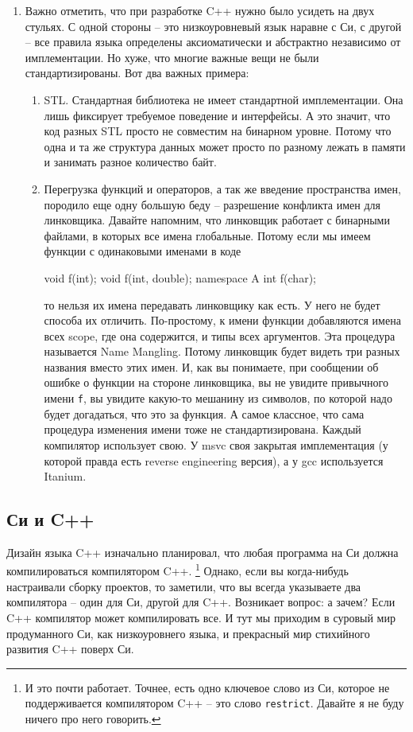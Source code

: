 \begin{enumerate}
\item %
Важно отметить, что при разработке C++ нужно было усидеть на двух стульях.
С одной стороны -- это низкоуровневый язык наравне с Си, с другой -- все правила языка определены аксиоматически и абстрактно независимо от имплементации.
Но хуже, что многие важные вещи не были стандартизированы.
Вот два важных примера:
\begin{enumerate}
\item STL.
Стандартная библиотека не имеет стандартной имплементации.
Она лишь фиксирует требуемое поведение и интерфейсы.
А это значит, что код разных STL просто не совместим на бинарном уровне.
Потому что одна и та же структура данных может просто по разному лежать в памяти и занимать разное количество байт.

\item Перегрузка функций и операторов, а так же введение пространства имен, породило еще одну большую беду -- разрешение конфликта имен для линковщика.
Давайте напомним, что линковщик работает с бинарными файлами, в которых все имена глобальные.
Потому если мы имеем функции с одинаковыми именами в коде
\begin{cppcode}
void f(int);
void f(int, double);
namespace A {
int f(char);
}
\end{cppcode}
то нельзя их имена передавать линковщику как есть.
У него не будет способа их отличить.
По-простому, к имени функции добавляются имена всех scope, где она содержится, и типы всех аргументов.
Эта процедура называется Name Mangling.
Потому линковщик будет видеть три разных названия вместо этих имен.
И, как вы понимаете, при сообщении об ошибке о функции на стороне линковщика, вы не увидите привычного имени \verb"f", вы увидите какую-то мешанину из символов, по которой надо будет догадаться, что это за функция.
А самое классное, что сама процедура изменения имени тоже не стандартизирована.
Каждый компилятор использует свою.
У msvc своя закрытая имплементация (у которой правда есть reverse engineering версия), а у gcc используется Itanium.
\end{enumerate}
\end{enumerate}

\subsection{Си и C++}

Дизайн языка C++ изначально планировал, что любая программа на Си должна компилироваться компилятором C++.%
\footnote{И это почти работает.
Точнее, есть одно ключевое слово из Си, которое не поддерживается компилятором C++ -- это слово \texttt{restrict}.
Давайте я не буду ничего про него говорить.}
Однако, если вы когда-нибудь настраивали сборку проектов, то заметили, что вы всегда указываете два компилятора -- один для Си, другой для C++.
Возникает вопрос: а зачем?
Если C++ компилятор может компилировать все.
И тут мы приходим в суровый мир продуманного Си, как низкоуровнего языка, и прекрасный мир стихийного развития C++ поверх Си.

